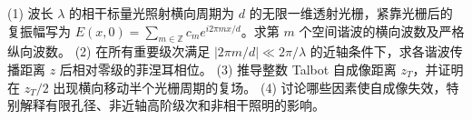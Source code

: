 (1) 波长 \(\lambda\) 的相干标量光照射横向周期为 \(d\) 的无限一维透射光栅，紧靠光栅后的复振幅写为 \(E(x,0)=\sum_{m\in\mathbb Z}c_m e^{i2\pi mx/d}\)。求第 \(m\) 个空间谐波的横向波数及严格纵向波数。
(2) 在所有重要级次满足 \(|2\pi m/d|\ll2\pi/\lambda\) 的近轴条件下，求各谐波传播距离 \(z\) 后相对零级的菲涅耳相位。
(3) 推导整数 Talbot 自成像距离 \(z_T\)，并证明在 \(z_T/2\) 出现横向移动半个光栅周期的复场。
(4) 讨论哪些因素使自成像失效，特别解释有限孔径、非近轴高阶级次和非相干照明的影响。
